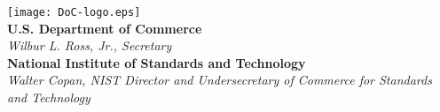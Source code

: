 \documentclass[12pt]{article}
\begin{document}
\begin{titlepage}
\texttt{[image: DoC-logo.eps]}\\ 
\vfill
\footnotesize \textbf{U.S. Department of Commerce}\\ 
\textit{Wilbur L. Ross, Jr., Secretary}\\
\vspace{10pt}
\textbf{National Institute of Standards and Technology}\\ 
\textit{Walter Copan, NIST Director and Undersecretary of Commerce for Standards and Technology}  
\end{titlepage}




\titleformat{\section}[runin]{\normalsize\raggedright\bfseries\sffamily}{}{0em}{}	%
\titleformat{\subsection}[runin]{\normalsize\raggedright\bfseries\sffamily}{}{0em}{}	%
\titleformat{\subsubsection}[runin]{\normalsize\raggedright\bfseries\sffamily}{}{0em}{}	%
\titleformat{\paragraph}[runin]{\normalsize\raggedright\bfseries\sffamily}{}{0em}{}	%


\end{document}
